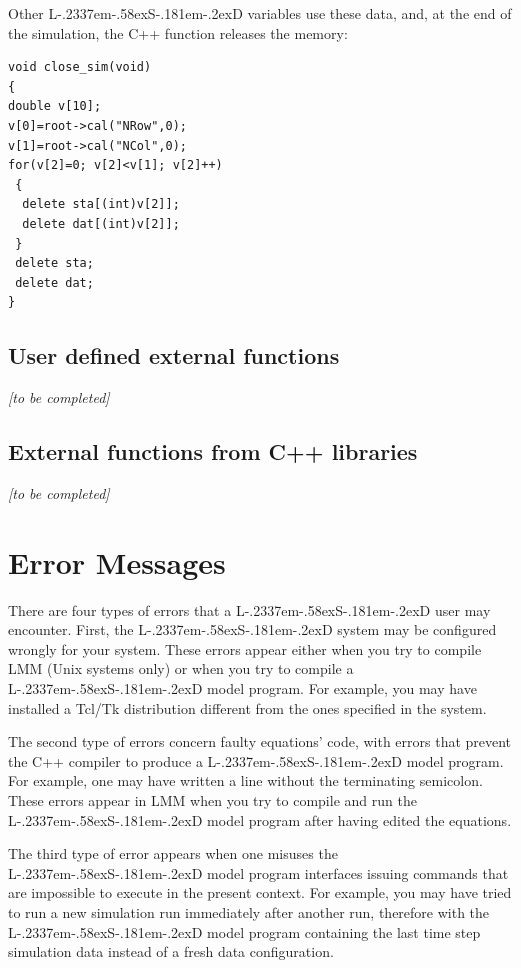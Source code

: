 \documentclass [11pt,a4paper] {book}
\def\LsD{{L\kern-.2337em\lower-.58ex\hbox{S}\kern-.181em\lower-.2ex\hbox{D}}\xspace}
\begin{document}
Other \LsD variables use these data, and, at the end of the simulation, the C++ function  releases the memory:


 \small
\begin{verbatim}
void close_sim(void)
{
double v[10];
v[0]=root->cal("NRow",0);
v[1]=root->cal("NCol",0);
for(v[2]=0; v[2]<v[1]; v[2]++)
 {
  delete sta[(int)v[2]];
  delete dat[(int)v[2]];
 }
 delete sta;
 delete dat;
}
\end{verbatim}
\normalsize


\subsection{User defined external functions}
\textit{[to be completed]}

\subsection{External functions from C++ libraries}
\textit{[to be completed]}





\section{Error Messages}\label{sec:err}

There are four types of errors that a \LsD user may encounter. First, the \LsD system may
be configured wrongly for your system. These errors appear either when you try to compile
LMM (Unix systems only) or when you try to compile a \LsD model program. For example, you
may have installed a Tcl/Tk distribution different from the ones specified in the system.

The second type of errors concern faulty equations' code, with errors that prevent the
C++ compiler to produce a \LsD model program. For example, one may have written a line
without the terminating semicolon. These errors appear in LMM when you try to compile and
run the \LsD model program after having edited the equations.

The third type of error appears when one misuses the \LsD model program interfaces issuing
commands that are impossible to execute in the present context. For example, you may have
tried to run a new simulation run immediately after another run, therefore with the \LsD
model program containing the last time step simulation data instead of a fresh data
configuration.
\end{document}
